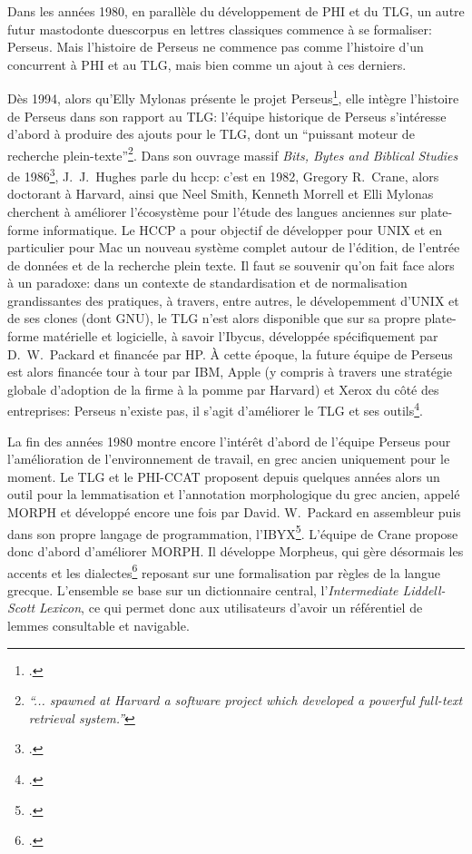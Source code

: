 Dans les années 1980, en parallèle du développement de PHI et du TLG, un autre futur mastodonte duescorpus en lettres classiques commence à se formaliser: Perseus. Mais l'histoire de Perseus ne commence pas comme l'histoire d'un concurrent à PHI et au TLG, mais bien comme un ajout à ces derniers. 


Dès 1994, alors qu'Elly Mylonas présente le projet Perseus\footcite{mylonas_perseus_1993}, elle intègre l'histoire de Perseus dans son rapport au TLG: l'équipe historique de Perseus s'intéresse d'abord à produire des ajouts pour le TLG, dont un \enquote{puissant moteur de recherche plein-texte}\footnote{\textit{\enquote{... spawned at Harvard a software project which developed a powerful full-text retrieval system.}}}. Dans son ouvrage massif \textit{Bits, Bytes and Biblical Studies} de 1986\footcite[p. 598]{hughes_bits_1987}, J.~J.~Hughes parle du \acrfull{hccp}: c'est en 1982, Gregory R.~Crane, alors doctorant à Harvard, ainsi que Neel Smith, Kenneth Morrell et Elli Mylonas cherchent à améliorer l'écosystème pour l'étude des langues anciennes sur plate-forme informatique. Le HCCP a pour objectif de développer pour UNIX et en particulier pour Mac un nouveau système complet autour de l'édition, de l'entrée de données et de la recherche plein texte. Il faut se souvenir qu'on fait face alors à un paradoxe: dans un contexte de standardisation et de normalisation grandissantes des pratiques, à travers, entre autres, le dévelopemment d'UNIX et de ses clones (dont GNU), le TLG n'est alors disponible que sur sa propre plate-forme matérielle et logicielle, à savoir l'Ibycus, développée spécifiquement par D.~W.~Packard et financée par HP.  À cette époque, la future équipe de Perseus est alors financée tour à tour par IBM, Apple (y compris à travers une stratégie globale d'adoption de la firme à la pomme par Harvard) et Xerox du côté des entreprises: Perseus n'existe pas, il s'agit d'améliorer le TLG et ses outils\footcite{schreibman_classics_2004}. 


La fin des années 1980 montre encore l'intérêt d'abord de l'équipe Perseus pour l'amélioration de l'environnement de travail, en grec ancien uniquement pour le moment. Le TLG et le PHI-CCAT proposent depuis quelques années alors un outil pour la lemmatisation et l'annotation morphologique du grec ancien, appelé MORPH et développé encore une fois par David. W.~Packard en assembleur puis dans son propre langage de programmation, l'IBYX\footcite[p.554-555]{hughes_bits_1987}. L'équipe de Crane propose donc d'abord d'améliorer MORPH. Il développe Morpheus, qui gère désormais les accents et les dialectes\footcite{mylonas_perseus_1993} reposant sur une formalisation par règles de la langue grecque. L'ensemble se base sur un dictionnaire central, l'\textit{Intermediate Liddell-Scott Lexicon}, ce qui permet donc aux utilisateurs d'avoir un référentiel de lemmes consultable et navigable.

